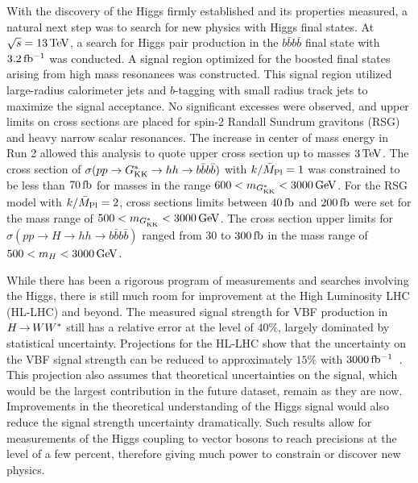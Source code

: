 With the discovery of the Higgs firmly established and its properties measured, a natural next step was to search for new physics with Higgs final states. At $\sqrt{s} = 13 \TeV$, a search for Higgs pair production in the $b\bar{b}b\bar{b}$ final state with $3.2\mbox{\,fb$^{-1}$}$ was conducted. A signal region optimized for the boosted final states arising from high mass resonances was constructed. This signal region utilized large-radius calorimeter jets and $b$-tagging with small radius track jets to maximize the signal acceptance. No significant excesses were observed, and upper limits on cross sections are placed for spin-2 Randall Sundrum gravitons (RSG) and heavy narrow scalar resonances. The increase in center of mass energy in Run 2 allowed this analysis to quote upper cross section up to masses $3 \TeV$. The cross section of $\sigma(pp \to G^*_{\rm KK} \to hh \to b\bar{b}b\bar{b})$ with $k/\bar{M}_{\rm Pl}=1$ was constrained to be less than $70 \mbox{\,fb}$ for masses in the range $600 < m_{\Gkk} < 3000 \GeV$. For the RSG model with $k/\bar{M}_{\rm Pl}=2$, cross sections limits between $40\mbox{\,fb}$ and $200 \mbox{\,fb}$ were set for the mass range of $500 < m_{\Gkk} < 3000 \GeV$. The cross section upper limits for $\sigma(pp \to H \to hh \to b\bar{b}b\bar{b})$ ranged from $30$ to $300 \mbox{\,fb}$ in the mass range of $500 < m_{H} < 3000 \GeV$. 

While there has been a rigorous program of measurements and searches involving the Higgs, there is still much room for improvement at the High Luminosity LHC (HL-LHC) and beyond. The measured signal strength for VBF production in $H{\,{\rightarrow}\,}WW^\ast$ still has a relative error at the level of $40\%$, largely dominated by statistical uncertainty. Projections for the HL-LHC show that the uncertainty on the VBF signal strength can be reduced to approximately $15\%$ with $3000 \mbox{\,fb$^{-1}$}$~\cite{HiggsProj,ScopingDocument}. This projection also assumes that theoretical uncertainties on the signal, which would be the largest contribution in the future dataset, remain as they are now. Improvements in the theoretical understanding of the Higgs signal would also reduce the signal strength uncertainty dramatically. Such results allow for measurements of the Higgs coupling to vector bosons to reach precisions at the level of a few percent, therefore giving much power to constrain or discover new physics. 

